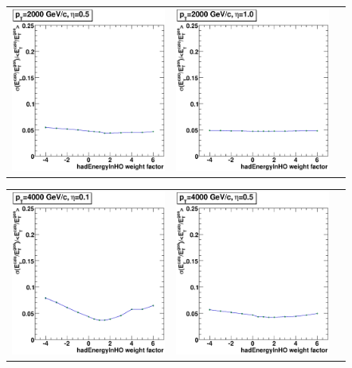 \documentclass{cmspaper}
\begin{document}
\begin{appendices}
\begin{center}
\begin{tabular}{lll}
 \includegraphics[width=2in]{figs/ET_res_vs_HO_wght_eta0.5_pT2000.eps} &
 \includegraphics[width=2in]{figs/ET_res_vs_HO_wght_eta1.0_pT2000.eps} \\
\end{tabular}
\end{center}
\begin{center}
\begin{tabular}{lll}
 \includegraphics[width=2in]{figs/ET_res_vs_HO_wght_eta0.1_pT4000.eps} &
 \includegraphics[width=2in]{figs/ET_res_vs_HO_wght_eta0.5_pT4000.eps} &

\end{tabular}
\end{center}
\end{appendices}
\end{document}
